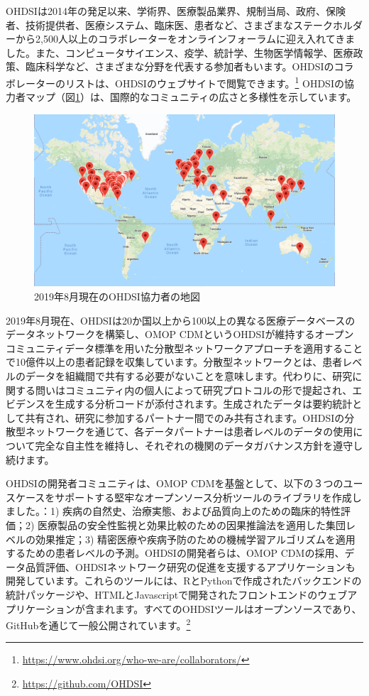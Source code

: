 \documentclass[
  11pt]{book}
\theoremstyle{definition}
\theoremstyle{definition}
\theoremstyle{definition}
\theoremstyle{definition}
\theoremstyle{remark}
\begin{document}
OHDSIは2014年の発足以来、学術界、医療製品業界、規制当局、政府、保険者、技術提供者、医療システム、臨床医、患者など、さまざまなステークホルダーから2,500人以上のコラボレーターをオンラインフォーラムに迎え入れてきました。また、コンピュータサイエンス、疫学、統計学、生物医学情報学、医療政策、臨床科学など、さまざまな分野を代表する参加者もいます。OHDSIのコラボレーターのリストは、OHDSIのウェブサイトで閲覧できます。\footnote{\url{https://www.ohdsi.org/who-we-are/collaborators/}} OHDSIの協力者マップ（図\ref{fig:collaboratormap}）は、国際的なコミュニティの広さと多様性を示しています。

\begin{figure}

{\centering \includegraphics[width=1\linewidth]{images/OhdsiCommunity/mapOfCollaborators} 

}

\caption{2019年8月現在のOHDSI協力者の地図}\label{fig:collaboratormap}
\end{figure}

2019年8月現在、OHDSIは20か国以上から100以上の異なる医療データベースのデータネットワークを構築し、OMOP CDMというOHDSIが維持するオープンコミュニティデータ標準を用いた分散型ネットワークアプローチを適用することで10億件以上の患者記録を収集しています。分散型ネットワークとは、患者レベルのデータを組織間で共有する必要がないことを意味します。代わりに、研究に関する問いはコミュニティ内の個人によって研究プロトコルの形で提起され、エビデンスを生成する分析コードが添付されます。生成されたデータは要約統計として共有され、研究に参加するパートナー間でのみ共有されます。OHDSIの分散型ネットワークを通じて、各データパートナーは患者レベルのデータの使用について完全な自主性を維持し、それぞれの機関のデータガバナンス方針を遵守し続けます。

OHDSIの開発者コミュニティは、OMOP CDMを基盤として、以下の３つのユースケースをサポートする堅牢なオープンソース分析ツールのライブラリを作成しました。：1) 疾病の自然史、治療実態、および品質向上のための臨床的特性評価；2) 医療製品の安全性監視と効果比較のための因果推論法を適用した集団レベルの効果推定；3) 精密医療や疾病予防のための機械学習アルゴリズムを適用するための患者レベルの予測。OHDSIの開発者らは、OMOP CDMの採用、データ品質評価、OHDSIネットワーク研究の促進を支援するアプリケーションも開発しています。これらのツールには、RとPythonで作成されたバックエンドの統計パッケージや、HTMLとJavascriptで開発されたフロントエンドのウェブアプリケーションが含まれます。すべてのOHDSIツールはオープンソースであり、GitHubを通じて一般公開されています。\footnote{\url{https://github.com/OHDSI}}
\end{document}
